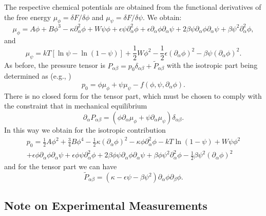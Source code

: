 The respective chemical potentials are obtained from the functional
derivatives of the free energy $\mu_\phi = \delta F / \delta \phi$ and
$\mu_\psi = \delta F / \delta \psi$. We obtain:
\begin{equation}
\mu_\phi =
A\phi + B\phi^3 -\kappa \partial_\alpha^2 \phi
+ W\psi\phi + \epsilon\psi\partial_\alpha^2 \phi
+ \epsilon \partial_\alpha \phi \partial_\alpha \psi
+ 2\beta \psi\partial_\alpha\phi \partial_\alpha \psi
+ \beta \psi^2 \partial_\alpha^2 \phi,
\end{equation}
and
\begin{equation}
\mu_\psi = kT \left[ \ln\psi - \ln(1-\psi) \right]
+ {\textstyle \frac{1}{2}}W\phi^2
- {\textstyle \frac{1}{2}}\epsilon (\partial_\alpha \phi)^2
- \beta\psi (\partial_\alpha \phi)^2.
\end{equation}
As before, the pressure tensor is $P_{\alpha\beta} = p_0\delta_{\alpha\beta}
+ \tilde{P}_{\alpha\beta}$ with the isotropic part being determined as (e.g.,
\cite{theissengompper})
\begin{equation}
p_0 = \phi \mu_\phi + \psi \mu_\psi - f(\phi, \psi, \partial_\alpha \phi).
\end{equation}
There is no closed form for the tensor part, which must be chosen to
comply with the constraint that in mechanical equilibrium
\begin{equation}
\partial_\alpha P_{\alpha\beta} = (\phi\partial_\alpha\mu_\phi +
\psi\partial_\alpha\mu_\psi)\delta_{\alpha\beta}.
\end{equation}
In this way we obtain for the isotropic contribution
\begin{eqnarray}
p_0 = {\textstyle \frac{1}{2}}A\phi^2 + {\textstyle \frac{3}{4}}B\phi^4 
- {\textstyle\frac{1}{2}}\kappa (\partial_\alpha\phi)^2 
- \kappa \phi \partial_\alpha^2 \phi
- kT \ln(1-\psi) + W\psi\phi^2
\nonumber\\
+ \epsilon \phi \partial_\alpha \phi \partial_\alpha \psi
+ \epsilon\phi\psi \partial_\alpha^2 \phi
+ 2 \beta\phi\psi \partial_\alpha \phi \partial_\alpha\psi
+ \beta \phi \psi^2 \partial_\alpha^2 \phi
- {\textstyle\frac{1}{2}} \beta \psi^2 (\partial_\alpha \phi)^2
\end{eqnarray}
and for the tensor part we can have
\begin{equation}
\tilde{P}_{\alpha\beta} =
(\kappa - \epsilon \psi - \beta\psi^2) 
\partial_\alpha \phi \partial_\beta \phi.
\end{equation}

\subsection{Note on Experimental Measurements}

